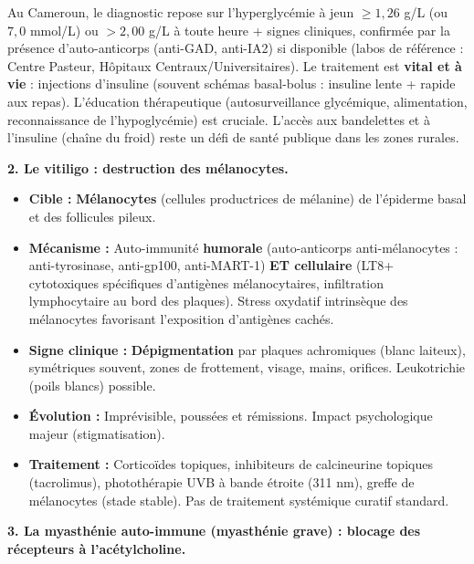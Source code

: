 \documentclass[11pt]{article}
\begin{document}
\begin{exemplebox}
Au Cameroun, le diagnostic repose sur l'hyperglycémie à jeun $\ge 1,26$ g/L (ou $7,0$ mmol/L) ou $> 2,00$ g/L à toute heure + signes cliniques, confirmée par la présence d'auto-anticorps (anti-GAD, anti-IA2) si disponible (labos de référence : Centre Pasteur, Hôpitaux Centraux/Universitaires). Le traitement est \textbf{vital et à vie} : injections d'insuline (souvent schémas basal-bolus : insuline lente + rapide aux repas). L'éducation thérapeutique (autosurveillance glycémique, alimentation, reconnaissance de l'hypoglycémie) est cruciale. L'accès aux bandelettes et à l'insuline (chaîne du froid) reste un défi de santé publique dans les zones rurales.
\end{exemplebox}

\textbf{2. Le vitiligo : destruction des mélanocytes.}

\begin{propriete}[Vitiligo]
\begin{itemize}
    \item \textbf{Cible :} \textbf{Mélanocytes} (cellules productrices de mélanine) de l'épiderme basal et des follicules pileux.
    \item \textbf{Mécanisme :} Auto-immunité \textbf{humorale} (auto-anticorps anti-mélanocytes : anti-tyrosinase, anti-gp100, anti-MART-1) \textbf{ET cellulaire} (LT8+ cytotoxiques spécifiques d'antigènes mélanocytaires, infiltration lymphocytaire au bord des plaques). Stress oxydatif intrinsèque des mélanocytes favorisant l'exposition d'antigènes cachés.
    \item \textbf{Signe clinique :} \textbf{Dépigmentation} par plaques achromiques (blanc laiteux), symétriques souvent, zones de frottement, visage, mains, orifices. Leukotrichie (poils blancs) possible.
    \item \textbf{Évolution :} Imprévisible, poussées et rémissions. Impact psychologique majeur (stigmatisation).
    \item \textbf{Traitement :} Corticoïdes topiques, inhibiteurs de calcineurine topiques (tacrolimus), photothérapie UVB à bande étroite (311 nm), greffe de mélanocytes (stade stable). Pas de traitement systémique curatif standard.
\end{itemize}
\end{propriete}

\textbf{3. La myasthénie auto-immune (myasthénie grave) : blocage des récepteurs à l'acétylcholine.}
\end{document}
